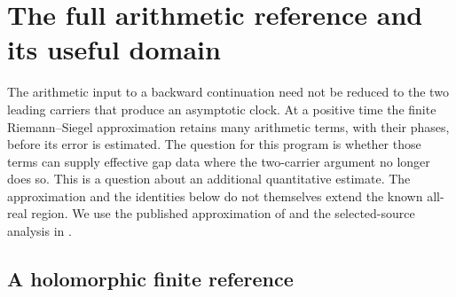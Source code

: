 \section{The full arithmetic reference and its useful domain}
\label{sec:arithmetic-source}

The arithmetic input to a backward continuation need not be reduced to
the two leading carriers that produce an asymptotic clock.  At a positive
time the finite Riemann--Siegel approximation retains many arithmetic
terms, with their phases, before its error is estimated.  The question
for this program is whether those terms can supply effective gap data
where the two-carrier argument no longer does so.  This is a question
about an additional quantitative estimate.  The approximation and the
identities below do not themselves extend the known all-real region.
We use the published approximation of \cite{Polymath2019} and the
selected-source analysis in \cite{VCDCMDiscussion11,VCDCMDiscussion12}.

\subsection{A holomorphic finite reference}

